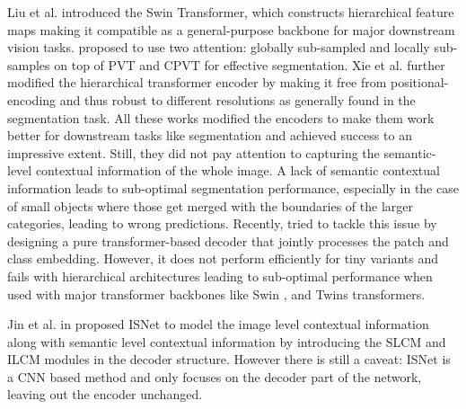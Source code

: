 \documentclass[10pt,twocolumn,letterpaper]{article}
\begin{document}
Liu et al. \cite{swin-T} introduced the Swin Transformer, which constructs hierarchical feature maps making it compatible as a general-purpose backbone for major downstream vision tasks. \cite{twins} proposed to use two attention: globally sub-sampled and locally sub-samples on top of PVT \cite{pvt} and CPVT \cite{cpvt} for effective segmentation. Xie et al. \cite{segformer} further modified the hierarchical transformer encoder by making it free from positional-encoding and thus robust to different resolutions as generally found in the segmentation task. All these works modified the encoders to make them work better for downstream tasks like segmentation and achieved success to an impressive extent. Still, they did not pay attention to capturing the semantic-level contextual information of the whole image. A lack of semantic contextual information leads to sub-optimal segmentation performance, especially in the case of small objects where those get merged with the boundaries of the larger categories, leading to wrong predictions. Recently, \cite{segmenter} tried to tackle this issue by designing a pure transformer-based decoder that jointly processes the patch and class embedding. However, it does not perform efficiently for tiny variants and fails with hierarchical architectures leading to sub-optimal performance when used with major transformer backbones like Swin \cite{swin-T}, and Twins \cite{twins} transformers.



Jin et al. in \cite{isnet} proposed ISNet to model the image level contextual information along with semantic level contextual information by introducing the SLCM and ILCM modules in the decoder structure. However there is still a caveat: ISNet is a CNN based method and only focuses on the decoder part of the network, leaving out the encoder unchanged.
\end{document}
